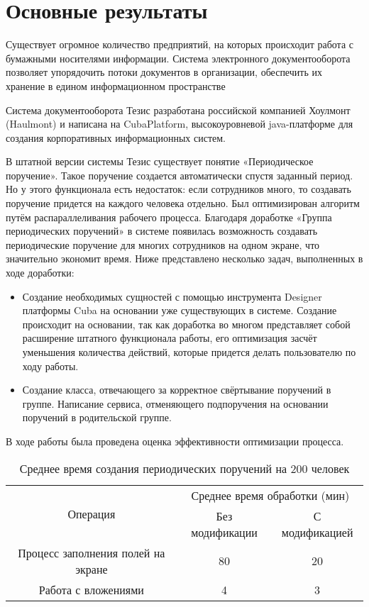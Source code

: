 \section{Основные результаты}


Существует огромное количество предприятий, на которых происходит работа с бумажными носителями информации. Система электронного документооборота позволяет упорядочить потоки документов в организации, обеспечить их хранение в едином информационном пространстве

Система документооборота Тезис \cite{Thesis1} разработана российской компанией Хоулмонт (Haulmont) и написана на CubaPlatform, высокоуровневой java-платформе для создания корпоративных информационных систем.


 В штатной версии системы Тезис существует понятие «Периодическое поручение». Такое поручение создается автоматически спустя заданный период. Но у этого функционала есть недостаток: если сотрудников много, то создавать поручение придется на каждого человека отдельно. Был оптимизирован алгоритм путём распараллеливания рабочего процесса. Благодаря доработке «Группа периодических поручений» в системе появилась возможность создавать периодические поручение для многих сотрудников на одном экране, что значительно экономит время. Ниже представлено несколько задач, выполненных в ходе доработки:

\begin{itemize}
 \item Создание необходимых сущностей с помощью инструмента Designer платформы Cuba на основании уже существующих в системе. Создание происходит на основании, так как доработка во многом представляет собой расширение штатного функционала работы, его оптимизация засчёт уменьшения количества действий, которые придется делать пользователю по ходу работы.
 \item Создание класса, отвечающего за корректное свёртывание поручений в группе. Написание сервиса, отменяющего подпоручения на основании поручений в родительской группе.
\end{itemize}

В ходе работы была проведена оценка эффективности оптимизации процесса.

\begin{table}[htbp]
    \centering
    \caption{Среднее время создания периодических поручений на 200 человек}
    \begin{tabular}{|c|c|c|}
        \hline
        \multirow{2}{*}{Операция} & \multicolumn{2}{c|}{Среднее время обработки (мин)} \\ \cline{2-3}
         & Без модификации & С модификацией \\ \hline
        Процесс заполнения полей на экране & 80 & 20 \\ \hline
        Работа с вложениями  & 4 & 3 \\ \hline
    \end{tabular}
    \label{tab:my_table}
\end{table}

